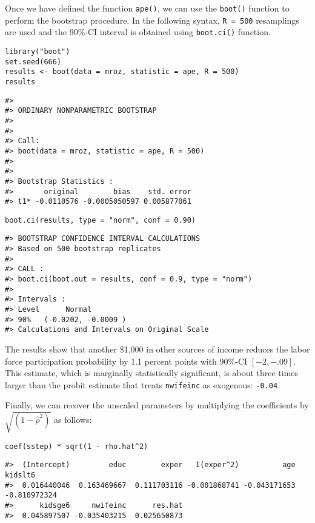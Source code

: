 Once we have defined the function \texttt{ape()}, we can use the \texttt{boot()} function to perform the bootstrap procedure. In the following syntax, \texttt{R\ =\ 500} resamplings are used and the 90\%-CI interval is obtained using \texttt{boot.ci()} function.

\begin{verbatim}
library("boot")
set.seed(666)
results <- boot(data = mroz, statistic = ape, R = 500)
results
\end{verbatim}

\begin{verbatim}
#> 
#> ORDINARY NONPARAMETRIC BOOTSTRAP
#> 
#> 
#> Call:
#> boot(data = mroz, statistic = ape, R = 500)
#> 
#> 
#> Bootstrap Statistics :
#>       original        bias    std. error
#> t1* -0.0110576 -0.0005050597 0.005877061
\end{verbatim}

\begin{verbatim}
boot.ci(results, type = "norm", conf = 0.90)
\end{verbatim}

\begin{verbatim}
#> BOOTSTRAP CONFIDENCE INTERVAL CALCULATIONS
#> Based on 500 bootstrap replicates
#> 
#> CALL : 
#> boot.ci(boot.out = results, conf = 0.9, type = "norm")
#> 
#> Intervals : 
#> Level      Normal        
#> 90%   (-0.0202, -0.0009 )  
#> Calculations and Intervals on Original Scale
\end{verbatim}

The results show that another \$1,000 in other sources of income reduces the labor force participation probability by 1.1 percent points with 90\%-CI \(\left[-2, -.09\right]\). This estimate, which is marginally statistically significant, is about three times larger than the probit estimate that treats \texttt{nwifeinc} as exogenous: \texttt{-0.04}.

Finally, we can recover the unscaled parameters by multiplying the coefficients by \(\sqrt{\left(1 - \widehat{\rho}^2\right)}\) as follows:

\begin{verbatim}
coef(sstep) * sqrt(1 - rho.hat^2)
\end{verbatim}

\begin{verbatim}
#>  (Intercept)         educ        exper   I(exper^2)          age      kidslt6 
#>  0.016440046  0.163469667  0.111703116 -0.001868741 -0.043171653 -0.810972324 
#>      kidsge6     nwifeinc      res.hat 
#>  0.045897507 -0.035403215  0.025650873
\end{verbatim}

